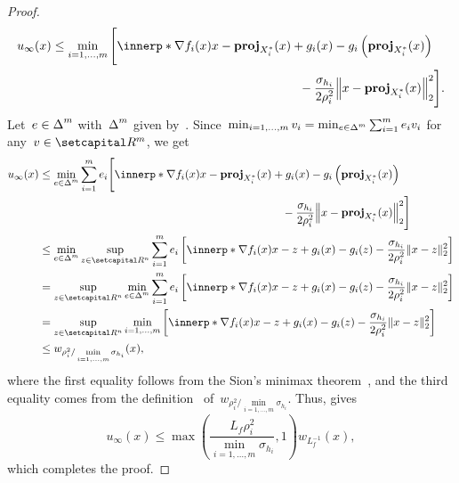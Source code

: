 \documentclass[../main]{subfiles}
\begin{document}
\begin{proof}
    \begin{equation}
        u_\infty(x) \le \min_{i = 1, \dots, m}
        \begin{multlined}[t]
            \Biggl[ \innerp*{\nabla f_i(x)}{x - \proj_{X_i^*}(x)} + g_i(x) - g_i\left( \proj_{X_i^*}(x) \right) \\
                - \frac{\sigma_{h_i}}{2 \rho_i^2} \norm*{x - \proj_{X_i^*}(x)}_2^2 \Biggr]
            .\end{multlined}
    \end{equation}
    Let~$e \in \operatorname{\Delta}^m$ with~$\operatorname{\Delta}^m$ given by~.
    Since~$\min_{i = 1, \dots, m} v_i = \min_{e \in \operatorname{\Delta}^m} \sum_{i = 1}^{m} e_i v_i$ for any~$v \in \setR^m$, we get
    \begin{align}
        u_\infty(x) & \le \min_{e \in \simplex^m} \sum_{i = 1}^{m} e_i
        \begin{multlined}[t]
            \Biggl[ \innerp*{\nabla f_i(x)}{x - \proj_{X_i^*}(x)} + g_i(x) - g_i\left( \proj_{X_i^*}(x) \right) \\
                - \frac{\sigma_{h_i}}{2 \rho_i^2} \norm*{x - \proj_{X_i^*}(x)}_2^2 \Biggr]
        \end{multlined}                                                                                                                                    \\
                    & \le \min_{e \in \simplex^m} \sup_{z \in \setR^n} \sum_{i = 1}^{m} e_i \left[ \innerp*{\nabla f_i(x)}{x - z} + g_i(x) - g_i(z) - \frac{\sigma_{h_i}}{2 \rho_i^2} \norm{x - z}_2^2 \right] \\
                    & = \sup_{z \in \setR^n} \min_{e \in \simplex^m} \sum_{i = 1}^{m} e_i \left[ \innerp*{\nabla f_i(x)}{x - z} + g_i(x) - g_i(z) - \frac{\sigma_{h_i}}{2 \rho_i^2} \norm{x - z}_2^2 \right]   \\
                    & = \sup_{z \in \setR^n} \min_{i = 1, \dots, m} \left[ \innerp*{\nabla f_i(x)}{x - z} + g_i(x) - g_i(z) - \frac{\sigma_{h_i}}{2 \rho_i^2} \norm{x - z}_2^2 \right]                         \\
                    & \le w_{\rho_i^2 / \min\limits_{i = 1, \dots, m} \sigma_{h_i}}(x)
        ,\end{align}
    where the first equality follows from the Sion's minimax theorem~\cite{Sion1958}, and the third equality comes from the definition~ of~$w_{\rho_i^2 / \min\limits_{i = 1, \dots, m} \sigma_{h_i}}$.
    Thus,  gives
    \begin{equation}
        u_\infty(x) \le \max \left( \frac{L_f \rho_i^2}{\min\limits_{i = 1, \dots, m} \sigma_{h_i}} , 1 \right) w_{L_f^{-1}}(x)
        ,\end{equation}
    which completes the proof.
\end{proof}
\end{document}
